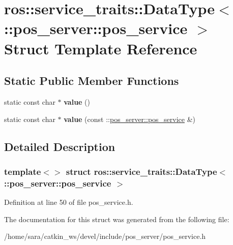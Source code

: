 \hypertarget{structros_1_1service__traits_1_1DataType_3_01_1_1pos__server_1_1pos__service_01_4}{}\section{ros\+:\+:service\+\_\+traits\+:\+:Data\+Type$<$ \+:\+:pos\+\_\+server\+:\+:pos\+\_\+service $>$ Struct Template Reference}
\label{structros_1_1service__traits_1_1DataType_3_01_1_1pos__server_1_1pos__service_01_4}
\subsection*{Static Public Member Functions}
\begin{DoxyCompactItemize}
\item 
\mbox{\label{structros_1_1service__traits_1_1DataType_3_01_1_1pos__server_1_1pos__service_01_4_ae17c4b1ddca955d06df186e2238ed66b}} 
static const char $\ast$ {\bfseries value} ()
\item 
\mbox{\label{structros_1_1service__traits_1_1DataType_3_01_1_1pos__server_1_1pos__service_01_4_a3cf4e0ac2e3608ae9270886125cb81a2}} 
static const char $\ast$ {\bfseries value} (const \+::\hyperlink{structpos__server_1_1pos__service}{pos\+\_\+server\+::pos\+\_\+service} \&)
\end{DoxyCompactItemize}


\subsection{Detailed Description}
\subsubsection*{template$<$$>$\newline
struct ros\+::service\+\_\+traits\+::\+Data\+Type$<$ \+::pos\+\_\+server\+::pos\+\_\+service $>$}



Definition at line 50 of file pos\+\_\+service.\+h.



The documentation for this struct was generated from the following file\+:\begin{DoxyCompactItemize}
\item 
/home/sara/catkin\+\_\+ws/devel/include/pos\+\_\+server/pos\+\_\+service.\+h\end{DoxyCompactItemize}
